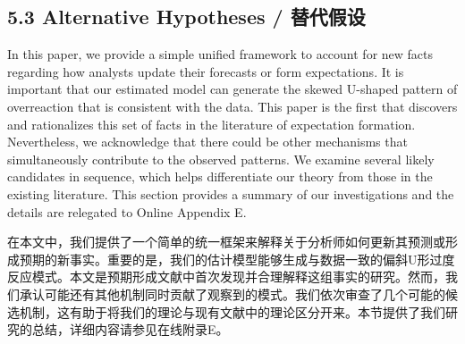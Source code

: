 \documentclass[12pt,a4paper]{article}
\newenvironment{original}
  {\par\medskip\noindent\ignorespaces}
  {\par\medskip}
\newenvironment{translation}
  {\par\noindent{\color{transblue}\ignorespaces}}
  {\par\bigskip}
\begin{document}
\subsection{5.3 Alternative Hypotheses / 替代假设}

\begin{original}
In this paper, we provide a simple unified framework to account for new facts regarding how analysts update their forecasts or form expectations. It is important that our estimated model can generate the skewed U-shaped pattern of overreaction that is consistent with the data. This paper is the first that discovers and rationalizes this set of facts in the literature of expectation formation. Nevertheless, we acknowledge that there could be other mechanisms that simultaneously contribute to the observed patterns. We examine several likely candidates in sequence, which helps differentiate our theory from those in the existing literature. This section provides a summary of our investigations and the details are relegated to Online Appendix E.
\end{original}
\begin{translation}
在本文中，我们提供了一个简单的统一框架来解释关于分析师如何更新其预测或形成预期的新事实。重要的是，我们的估计模型能够生成与数据一致的偏斜U形过度反应模式。本文是预期形成文献中首次发现并合理解释这组事实的研究。然而，我们承认可能还有其他机制同时贡献了观察到的模式。我们依次审查了几个可能的候选机制，这有助于将我们的理论与现有文献中的理论区分开来。本节提供了我们研究的总结，详细内容请参见在线附录E。
\end{translation}
\end{document}
